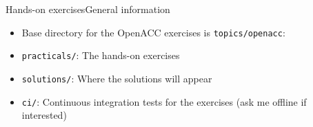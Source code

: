 \documentclass[12pt,aspectratio=169]{beamer}
\newcommand\shinline[2][]{\lstinline[style=shstyle,basicstyle=\ttfamily,#1]!#2!}
\begin{document}


\begin{frame}[fragile]{Hands-on exercises}{General information}
  \begin{itemize}
  \item Base directory for the OpenACC exercises is \shinline{topics/openacc}:
  \item \texttt{practicals/}: The hands-on exercises
  \item \texttt{solutions/}: Where the solutions will appear
  \item \texttt{ci/}: Continuous integration tests for the exercises (ask me offline if interested)
  \end{itemize}
\end{frame}
\end{document}
